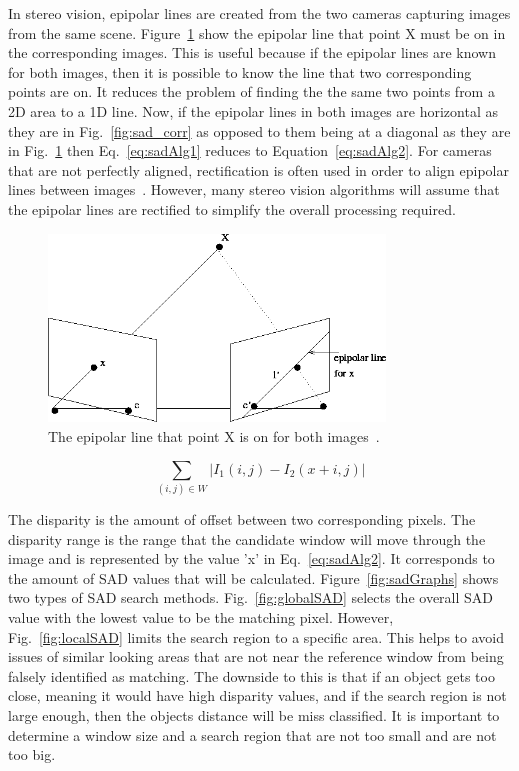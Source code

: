 In stereo vision, epipolar lines are created from the two cameras capturing images from the same scene. Figure~\ref{fig:epipolar} show the epipolar line that point X must be on in the corresponding images. This is useful because if the epipolar lines are known for both images, then it is possible to know the line that two corresponding points are on. It reduces the problem of finding the the same two points from a 2D area to a 1D line. Now, if the epipolar lines in both images are horizontal as they are in Fig.~\ref{fig:sad_corr} as opposed to them being at a diagonal as they are in Fig.~\ref{fig:epipolar} then Eq.~\ref{eq:sadAlg1} reduces to Equation~\ref{eq:sadAlg2}. For cameras that are not perfectly aligned, rectification is often used in order to align epipolar lines between images~\cite{rectification}. However, many stereo vision algorithms will assume that the epipolar lines are rectified to simplify the overall processing required.

\begin{figure}
\begin{center}
	\includegraphics[height=50mm]{figures/epipolar.png}
	\captionfonts
	\caption{The epipolar line that point X is on for both images~\cite{epipolar}.}
	\label{fig:epipolar}
\end{center}
\end{figure}

\begin{equation}
	\sum\limits_{(i,j)\in W}\left| I_{1}(i,j)-I_{2}(x+i,j) \right|
	\label{eq:sadAlg2}
\end{equation}

The disparity is the amount of offset between two corresponding pixels. The disparity range is the range that the candidate window will move through the image and is represented by the value 'x' in Eq.~\ref{eq:sadAlg2}. It corresponds to the amount of SAD values that will be calculated. Figure~\ref{fig:sadGraphs} shows two types of SAD search methods. Fig.~\ref{fig:globalSAD} selects the overall SAD value with the lowest value to be the matching pixel. However, Fig.~\ref{fig:localSAD} limits the search region to a specific area. This helps to avoid issues of similar looking areas that are not near the reference window from being falsely identified as matching. The downside to this is that if an object gets too close, meaning it would have high disparity values, and if the search region is not large enough, then the objects distance will be miss classified. It is important to determine a window size and a search region that are not too small and are not too big.

